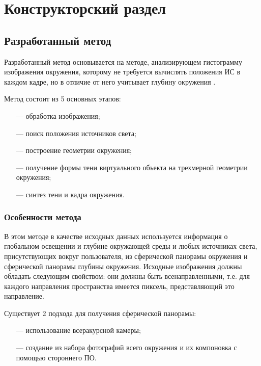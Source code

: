 \chapter{Конструкторский раздел}

\section{Разработанный метод}

Разработанный метод основывается на методе, анализирующем гистограмму изображения окружения, которому не требуется вычислять положения ИС в каждом кадре, но в отличие от него учитывает глубину окружения \cite{osti2019real}.

Метод состоит из 5 основных этапов:

\begin{enumerate}
	\item[---] обработка изображения;
	\item[---] поиск положения источников света;
	\item[---] построение геометрии окружения;
	\item[---] получение формы тени виртуального объекта на трехмерной геометрии окружения;
	\item[---] синтез тени и кадра окружения.
\end{enumerate}

\subsection{Особенности метода}

В этом методе в качестве исходных данных используется информация о глобальном освещении и глубине окружающей среды и любых источниках света, присутствующих вокруг пользователя, из сферической панорамы окружения и сферической панорамы глубины окружения. Исходные изображения должны обладать следующим свойством: они должны быть всенаправленными, т.е. для каждого направления пространства имеется пиксель, представляющий это направление.

Существует 2 подхода для получения сферической панорамы:

\begin{enumerate}
	\item[---] использование всеракурсной камеры;
	\item[---] создание из набора фотографий всего окружения и их компоновка с помощью стороннего ПО.
\end{enumerate}

